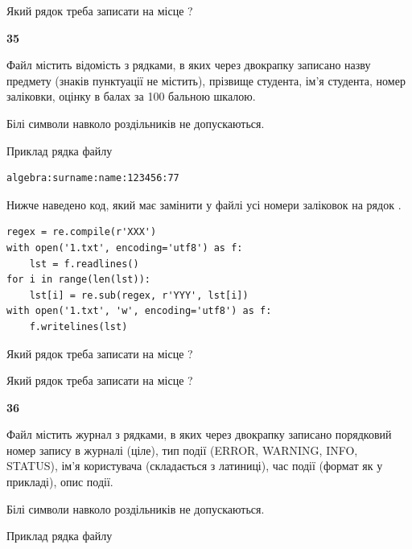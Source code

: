 Який рядок треба записати на місце  ?\par


\newpage

{\begin {center}\textbf{ 35}\end {center}}\par
Файл  містить відомість з рядками, в яких через двокрапку записа\-но назву предмету (знаків пунктуації не містить), прізвище студента, ім'я студента, номер залі\-ков\-ки, оцінку в балах за 100 бальною шкалою.

Білі символи навколо роздільників не допускаються.

Приклад рядка файлу



\begin{verbatim}
algebra:surname:name:123456:77
\end{verbatim}


Нижче наведено код, який має замінити у файлі усі номери заліковок на рядок \code{***}.



\begin{verbatim}
regex = re.compile(r'XXX')
with open('1.txt', encoding='utf8') as f:
    lst = f.readlines()
for i in range(len(lst)):
    lst[i] = re.sub(regex, r'YYY', lst[i])
with open('1.txt', 'w', encoding='utf8') as f:
    f.writelines(lst)
\end{verbatim}







Який рядок треба записати на місце  ?\par
\vspace{5mm}


Який рядок треба записати на місце  ?\par


\newpage

{\begin {center}\textbf{ 36}\end {center}}\par
Файл  містить журнал з рядками, в яких через двокрапку записано поряд\-ко\-вий номер запису в журналі (ціле), тип події (ERROR, WARNING, INFO, STATUS), ім'я користувача (складається з латиниці), час події (фор\-мат як у прикладі), опис події.

Білі символи навколо роздільників не допускаються.

Приклад рядка файлу



